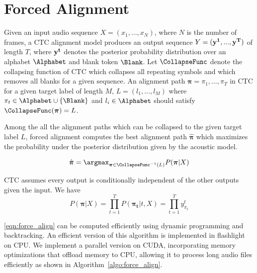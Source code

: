 \section{Forced Alignment}
\label{app:align}

Given an input audio sequence $X = (x_1,...,x_N)$, where $N$ is the number of frames, a CTC alignment model produces an output sequence $Y = (\bf{y^1,...,y^{T}})$ of length $T$, where $\bf{y^t}$ denotes the posterior probability distribution over an alphabet $\Alphabet$ and blank token $\Blank$. 
Let $\CollapseFunc$ denote the collapsing function of CTC which collapses all repeating symbols and which removes all blanks for a given sequence. 
An alignment path $\boldsymbol{\pi} = \pi_1,...,\pi_T$ in CTC for a given target label of length $M$, $L = (l_1,...,l_M)$ where $\pi_t \in \Alphabet \cup \{\Blank\}$ and $l_i \in \Alphabet$ should satisfy $\CollapseFunc(\boldsymbol{\pi}) = L$. 

Among the all the alignment paths which can be collapsed to the given target label $L$, forced alignment computes the best alignment path $\hat{\boldsymbol{\pi}}$ which maximizes the probability under the posterior distribution given by the acoustic model. 

\begin{equation} \label{eqn:force_align}
\hat{\boldsymbol{\pi}} = \argmax_{\boldsymbol{\pi} \in \CollapseFunc^{-1}(L)} P(\boldsymbol{\pi} | X) 
\end{equation}

CTC assumes every output is conditionally independent of the other outputs given the input. We have 
\begin{equation}
    P(\boldsymbol{\pi} | X) = \prod_{t=1}^{T} P(\boldsymbol{\pi_t} | t, X) = \prod_{t=1}^{T} y^t_{\pi_t}
\end{equation}

\autoref{eqn:force_align} can be computed efficiently using dynamic programming and backtracking.  
An efficient version of this algorithm is implemented in flashlight~\citep{kahn2022flashlight} on CPU. 
We implement a parallel version on CUDA, incorporating memory optimizations that offload memory to CPU, allowing it to process long audio files efficiently as shown in Algorithm~\ref{algo:force_align}.


